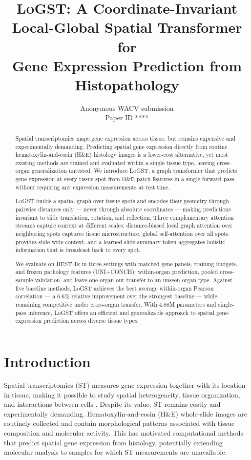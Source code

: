 \documentclass[10pt,twocolumn,letterpaper]{article}
\def\paperID{****}
\newcommand{\morph}{\textsc{LoGST}}
\begin{document}
\title{\morph: A Coordinate-Invariant Local-Global Spatial Transformer for\\
Gene Expression Prediction from Histopathology}

\author{Anonymous WACV submission\\
Paper ID \paperID}
\maketitle

\begin{abstract}
Spatial transcriptomics maps gene expression across tissue, but remains expensive and
experimentally demanding. Predicting spatial gene expression directly from routine
hematoxylin-and-eosin (H\&E) histology images is a lower-cost alternative, yet most existing
methods are trained and evaluated within a single tissue type, leaving cross-organ generalization
untested. We introduce \morph{}, a graph transformer that predicts gene expression at every tissue
spot from H\&E patch features in a single forward pass, without requiring any expression
measurements at test time.

\morph{} builds a spatial graph over tissue spots and encodes their geometry through pairwise
distances only — never through absolute coordinates — making predictions invariant to slide
translation, rotation, and reflection. Three complementary attention streams capture context at
different scales: distance-biased local graph attention over neighboring spots captures tissue
microstructure, global self-attention over all spots provides slide-wide context, and a learned
slide-summary token aggregates holistic information that is broadcast back to every spot.

We evaluate on HEST-1k in three settings with matched gene panels, training budgets, and frozen
pathology features (UNI+CONCH): within-organ prediction, pooled cross-sample validation, and
leave-one-organ-out transfer to an unseen organ type. Against five baseline methods, \morph{}
achieves the best average within-organ Pearson correlation — a $6.6\%$ relative improvement over
the strongest baseline — while remaining competitive under cross-organ transfer. With $4.88$M
parameters and single-pass inference, \morph{} offers an efficient and generalizable approach to
spatial gene-expression prediction across diverse tissue types.
\end{abstract}

\section{Introduction}
Spatial transcriptomics (ST) measures gene expression together with its location in tissue, making
it possible to study spatial heterogeneity, tissue organization, and interactions between cells
\cite{staahl2016visualization}. Despite its value, ST remains costly and experimentally demanding.
Hematoxylin-and-eosin (H\&E) whole-slide images are routinely collected and contain morphological
patterns associated with tissue composition and molecular activity. This has motivated computational
methods that predict spatial gene expression from histology, potentially extending molecular analysis
to samples for which ST measurements are unavailable.
\end{document}
